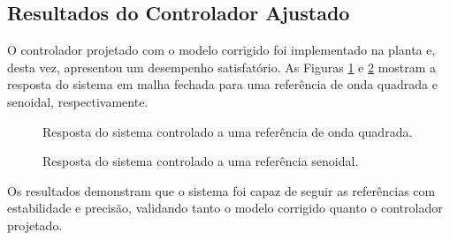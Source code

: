 \subsection{Resultados do Controlador Ajustado}
O controlador projetado com o modelo corrigido foi implementado na planta e, desta vez, apresentou um desempenho satisfatório. As Figuras \ref{fig:resp_degrau} e \ref{fig:resp_senoide} mostram a resposta do sistema em malha fechada para uma referência de onda quadrada e senoidal, respectivamente.

\begin{figure}[h]
    \centering
    \caption{Resposta do sistema controlado a uma referência de onda quadrada.}
    \label{fig:resp_degrau}
\end{figure}

\begin{figure}[h]
    \centering
    \caption{Resposta do sistema controlado a uma referência senoidal.}
    \label{fig:resp_senoide}
\end{figure}

Os resultados demonstram que o sistema foi capaz de seguir as referências com estabilidade e precisão, validando tanto o modelo corrigido quanto o controlador projetado.